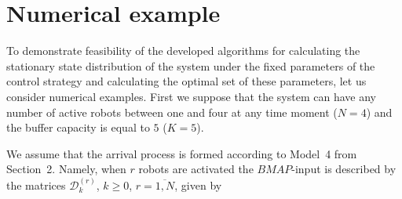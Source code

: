 \documentclass[11pt]{article}
\begin{document}
\section{Numerical example}

To demonstrate feasibility of the developed algorithms for
calculating the stationary state distribution of the system under
the fixed parameters of the control strategy and calculating the
optimal set of these parameters, let us consider numerical examples.
First we suppose that the system can have any number of active
robots between one and four at any time moment ($N=4$) and the
buffer capacity is equal to $5$ ($K=5$).

We assume that the arrival process is formed according to Model~4
from Section~2. Namely, when $r$ robots are activated the
$BMAP$-input is described by the matrices ${\mathcal D}_k^{(r)}$,
$k\geq 0$, $r=\overline{1,N}$, given by
\end{document}

